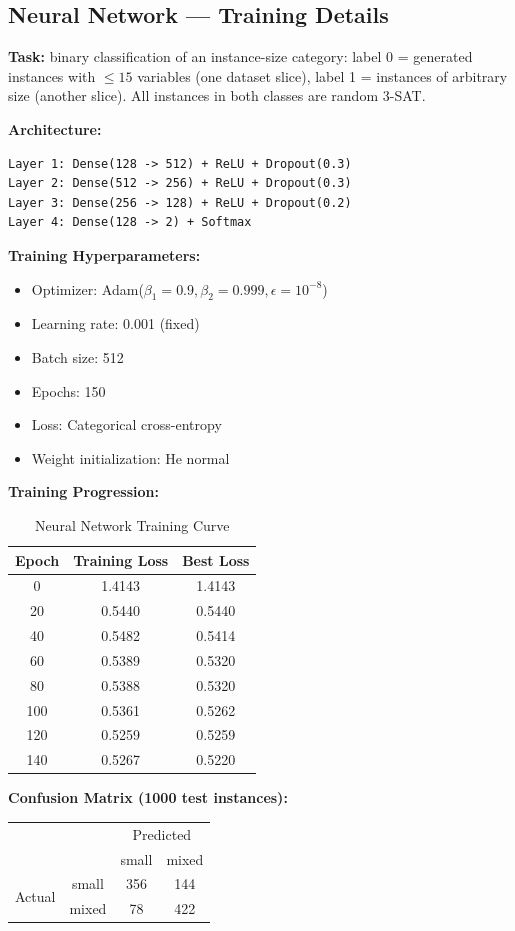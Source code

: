 \documentclass[11pt]{article}
\newcommand{\SAT}{\textsf{SAT}}
\begin{document}
\subsection{Neural Network --- Training Details}

\textbf{Task:} binary classification of an instance-size category: label 0 =
generated instances with $\leq 15$ variables (one dataset slice), label 1 =
instances of arbitrary size (another slice). All instances in both classes
are random 3-\SAT{}.

\textbf{Architecture:}
\begin{verbatim}
Layer 1: Dense(128 -> 512) + ReLU + Dropout(0.3)
Layer 2: Dense(512 -> 256) + ReLU + Dropout(0.3)
Layer 3: Dense(256 -> 128) + ReLU + Dropout(0.2)
Layer 4: Dense(128 -> 2) + Softmax
\end{verbatim}

\textbf{Training Hyperparameters:}
\begin{itemize}
\item Optimizer: Adam($\beta_1=0.9, \beta_2=0.999, \epsilon=10^{-8}$)
\item Learning rate: 0.001 (fixed)
\item Batch size: 512
\item Epochs: 150
\item Loss: Categorical cross-entropy
\item Weight initialization: He normal
\end{itemize}

\textbf{Training Progression:}
\begin{table}[h]
\centering
\caption{Neural Network Training Curve}
\begin{tabular}{ccc}
\toprule
Epoch & Training Loss & Best Loss \\
\midrule
0 & 1.4143 & 1.4143 \\
20 & 0.5440 & 0.5440 \\
40 & 0.5482 & 0.5414 \\
60 & 0.5389 & 0.5320 \\
80 & 0.5388 & 0.5320 \\
100 & 0.5361 & 0.5262 \\
120 & 0.5259 & 0.5259 \\
140 & 0.5267 & 0.5220 \\
\bottomrule
\end{tabular}
\end{table}

\textbf{Confusion Matrix (1000 test instances):}
\begin{table}[h]
\centering
\begin{tabular}{cc|cc}
& & \multicolumn{2}{c}{Predicted} \\
& & small & mixed \\
\hline
\multirow{2}{*}{Actual} & small & 356 & 144 \\
& mixed & 78 & 422 \\
\end{tabular}
\end{table}
\end{document}
